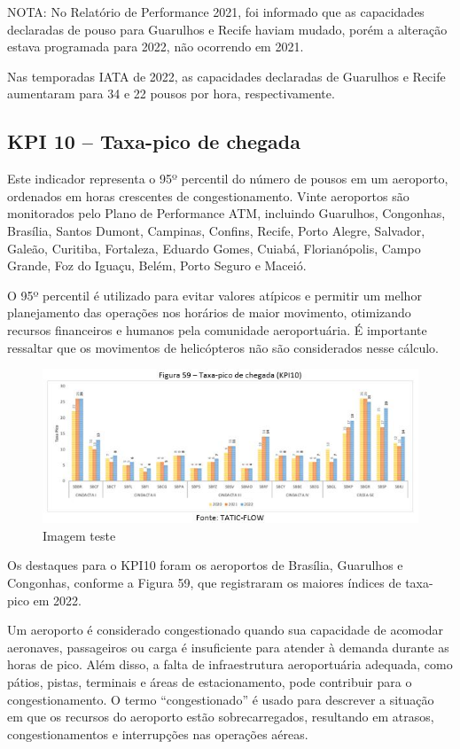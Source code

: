 \documentclass[
]{book}
\begin{document}
NOTA: No Relatório de Performance 2021, foi informado que as capacidades declaradas de pouso para Guarulhos e Recife haviam mudado, porém a alteração estava programada para 2022, não ocorrendo em 2021.

Nas temporadas IATA de 2022, as capacidades declaradas de Guarulhos e Recife aumentaram para 34 e 22 pousos por hora, respectivamente.

\hypertarget{kpi-10-taxa-pico-de-chegada}{%
\subsection{KPI 10 -- Taxa-pico de chegada}\label{kpi-10-taxa-pico-de-chegada}}

Este indicador representa o 95º percentil do número de pousos em um aeroporto, ordenados em horas crescentes de congestionamento. Vinte aeroportos são monitorados pelo Plano de Performance ATM, incluindo Guarulhos, Congonhas, Brasília, Santos Dumont, Campinas, Confins, Recife, Porto Alegre, Salvador, Galeão, Curitiba, Fortaleza, Eduardo Gomes, Cuiabá, Florianópolis, Campo Grande, Foz do Iguaçu, Belém, Porto Seguro e Maceió.

O 95º percentil é utilizado para evitar valores atípicos e permitir um melhor planejamento das operações nos horários de maior movimento, otimizando recursos financeiros e humanos pela comunidade aeroportuária. É importante ressaltar que os movimentos de helicópteros não são considerados nesse cálculo.

\begin{figure}
\centering
\includegraphics{imagens/fig48.jpg}
\caption{Imagem teste}
\end{figure}

Os destaques para o KPI10 foram os aeroportos de Brasília, Guarulhos e Congonhas, conforme a Figura 59, que registraram os maiores índices de taxa-pico em 2022.

Um aeroporto é considerado congestionado quando sua capacidade de acomodar aeronaves, passageiros ou carga é insuficiente para atender à demanda durante as horas de pico. Além disso, a falta de infraestrutura aeroportuária adequada, como pátios, pistas, terminais e áreas de estacionamento, pode contribuir para o congestionamento. O termo ``congestionado'' é usado para descrever a situação em que os recursos do aeroporto estão sobrecarregados, resultando em atrasos, congestionamentos e interrupções nas operações aéreas.
\end{document}
